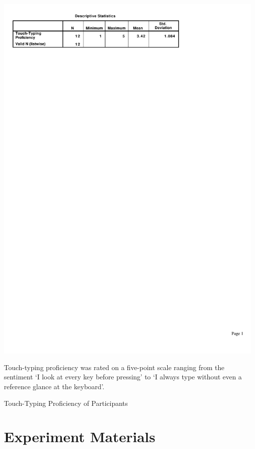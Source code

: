 \documentclass[11pt,openright,a4paper]{report}
\begin{document}
\begin{table}[ht]
\centerline{\includegraphics{figures/TouchTyping.pdf}}
\medskip
\small
Touch-typing proficiency was rated on a five-point scale ranging from the sentiment `I look at every key before pressing' to `I always type without even a reference glance at the keyboard'.
\caption{Touch-Typing Proficiency of Participants}
\label{fig:partic_ttype}
\end{table}

\FloatBarrier
\section{Experiment Materials}
\end{document}
